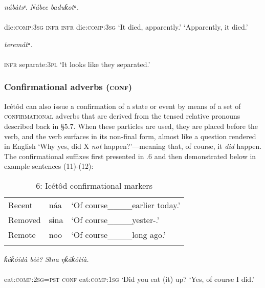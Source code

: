 \ea\label{ex:}
     \textit{nábàtsᵉ}.  \textit{Nábee}\textit{    baduƙotᵃ.} \\
    \\
die:\textsc{comp:3sg   infr}    \textsc{infr}     die:\textsc{comp:3sg}
\glt ‘It died, apparently.’    ‘Apparently, it died.’ 
\z




\ea\label{ex:}
\textit{   teremátᵃ.} \\
    \\
\textsc{infr}     separate:\textsc{3pl}
\glt ‘It looks like they separated.’ 
\z




\subsubsection{Confirmational adverbs (\textsc{conf})}

Icétôd can also issue a confirmation of a state or event by means of a set of \textsc{confirmational} adverbs that are derived from the tensed relative pronouns described back in §5.7. When these particles are used, they are placed before the verb, and the verb surfaces in its non-final form, almost like a question rendered in English ‘Why yes, did X \textit{not} happen?’—meaning that, of course, it \textit{did} happen. The confirmational suffixes first presented in .6 and then demonstrated below in example sentences (11)-(12):


\begin{table}
\caption{6: Icétôd confirmational markers}
\label{tab:9}


\begin{tabularx}{\textwidth}{XXX}
\lsptoprule

Recent & náa & ‘Of course\_\_\_\_earlier today.’\\
Removed & sɨna & ‘Of course\_\_\_\_yester-.’\\
Remote & noo & ‘Of course\_\_\_\_long ago.’\\
\lspbottomrule
\end{tabularx}
\end{table}



\ea\label{ex:}
\textit{ƙáƙóídà bèè?}    \textit{Sɨna}\textit{   ŋƙáƙótíà.} \\
    \\
eat:\textsc{comp:2sg=pst}    \textsc{conf}   eat\textsc{:comp:1sg}
\glt ‘Did you eat (it) up?  ‘Yes, of course I did.’ 
\z




